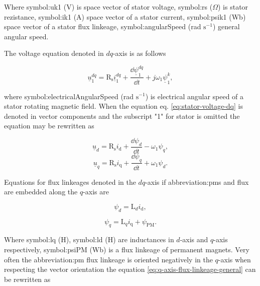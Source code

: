 \documentclass[a4paper, twoside, 11pt]{article}
\begin{document}
        Where \gls{symbol:uk1} (V) is space vector of stator voltage, \gls{symbol:rs} ($\Omega$) is stator rezistance, \gls{symbol:ik1} (A) space vector of a stator current, \gls{symbol:psik1} (Wb) space vector of a stator flux linkeage, \gls{symbol:angularSpeed} (rad $\text{s}^{-1}$) general angular speed.\par
        The voltage equation denoted in $dq$-axis is as follows

        \begin{equation}\label{eq:stator-voltage-dq}
            \underline{u}^{dq}_1 = \text{R}_\text{s} \underline{i}^{dq}_1 + \frac{\dd \underline{\psi}^{dq}_1 }{\dd t} + j \omega_1 \underline{\psi}^k_1,
        \end{equation}
        
        where \gls{symbol:electricalAngularSpeed} (rad $\text{s}^{-1}$) is electrical angular speed of a stator rotating magnetic field. When the equation eq. \ref{eq:stator-voltage-dq} is denoted in vector components and the subscript "1" for stator is omitted the equation may be rewritten as

        \begin{equation}
            \underline{u}_d = \text{R}_\text{s} i_\text{d} + \frac{\dd \psi_d}{\dd t} - \omega_1\psi_q,
        \end{equation}
        \begin{equation}
            \underline{u}_q = \text{R}_\text{s} i_\text{q} + \frac{\dd \psi_q}{\dd t} + \omega_1\psi_d.
        \end{equation}

        Equations for flux linkeages denoted in the $dq$-axis if \gls{abbreviation:pm}s and flux are embedded along the $q$-axis are

        \begin{equation}\label{eq:d-axis-flux-linkeage}
            \psi_d = \text{L}_d i_\text{d},
        \end{equation}

        \begin{equation}\label{eq:q-axis-flux-linkeage-general}
            \psi_q = \text{L}_q i_\text{q} + \psi_\text{PM}.
        \end{equation}

        Where \gls{symbol:lq} (H), \gls{symbol:ld} (H) are inductances in $d$-axis and $q$-axis respectively, \gls{symbol:psiPM} (Wb) is a flux linkeage of permanent magnets. Very often the \gls{abbreviation:pm} flux linkeage is oriented negatively in the $q$-axis when respecting the vector orientation the equation \ref{eq:q-axis-flux-linkeage-general} can be rewritten as
\end{document}
